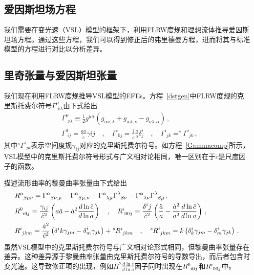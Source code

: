 \documentclass[jkps,preprint,fleqn]{revtex4}
\newcommand{\tc}{\tilde{c}}
\begin{document}
\begin{CJK*}{UTF8}{gbsn}
\section{爱因斯坦场方程} \label{sec:EFEs}

我们需要在变光速（VSL）模型的框架下，利用FLRW度规和理想流体推导爱因斯坦场方程。通过这些方程，我们可以得到修正后的弗里德曼方程，进而将其与标准模型的方程进行对比以分析差异。
\subsection{里奇张量与爱因斯坦张量}\label{subsec:RS}
我们现在利用FLRW度规\cite{Lee:2020zts,Lee:2025rpw}推导VSL模型的EFEs。方程~\eqref{dstgen}中FLRW度规的克里斯托费尔符号$\Gamma^{\mu}_{\,\,\nu\lambda}$由下式给出
\begin{align}
&\Gamma^{\mu}_{\,\,\nu\lambda} \equiv \frac{1}{2} g^{\mu\alpha} \left( g_{\alpha\nu,\lambda} + g_{\alpha\lambda,\nu} - g_{\nu\lambda,\alpha} \right) \label{Gamma}\,, \\ &\Gamma^{0}_{\,\,ij} = \frac{a\dot{a}}{\tc} \gamma{ij} \quad , \quad \Gamma^{i}_{\,\,0j} = \frac{1}{\tc}  \frac{\dot{a}}{a} \delta^i_j \quad , \quad \Gamma^{i}_{\,\,jk} = ^{s}\Gamma^{i}_{\,\,jk}  \label{Gammacomp} \,, \end{align}
其中$^{s}\Gamma^{i}_{\,\,jk}$表示空间度规$\gamma_{ij}$对应的克里斯托费尔符号。如方程~\eqref{Gammacomp}所示，VSL模型中的克里斯托费尔符号形式与广义相对论相同，唯一区别在于$\tc$是尺度因子的函数。

描述流形曲率的黎曼曲率张量由下式给出
\begin{align}
&\tensor{R}{^\alpha_\beta_\mu_\nu} = \tensor{\Gamma}{^\alpha_\beta_\nu_,_\mu} - \tensor{\Gamma}{^\alpha_\beta_\mu_,_\nu} + \tensor{\Gamma}{^\alpha_\lambda_\mu} \tensor{\Gamma}{^\lambda_\beta_\nu} - \tensor{\Gamma}{^\alpha_\lambda_\nu} \tensor{\Gamma}{^\lambda_\beta_\mu} \label{Rabmu} \,, \\ &\tensor{R}{^0_i_0_j} = \frac{\gamma_{ij}}{\tc^2} \left( a \ddot{a} - \dot{a}^2 \frac{d \ln \tc}{d \ln a} \right) \quad , \quad \tensor{R}{^i_0_0_j} = \frac{\delta^{i}{j}}{\tc^2} \left( \frac{\ddot{a}}{a} - \frac{\dot{a}^2}{a^2} \frac{d \ln \tc}{ d \ln a}  \right) \,, \label{R0i0j} \\ &\tensor{R}{^i_j_k_m} = \frac{\dot{a}^2}{\tc^2} \left( \delta^{i}{k} \gamma_{jm} - \delta^i_m \gamma_{jk} \right) + \tensor[^s]{R}{^i_j_k_m} \quad , \quad \tensor[^s]{R}{^i_j_k_m} = k \left( \delta^i_k \gamma_{jm} - \delta^i_m \gamma_{jk} \right) \,. \label{Rijkm} \end{align}
虽然VSL模型中的克里斯托费尔符号与广义相对论形式相同，但黎曼曲率张量存在差异。这种差异源于黎曼曲率张量由克里斯托费尔符号的导数导出，而后者包含时变光速。这导致修正项的出现，例如$H^2 \frac{d \ln \tc}{d \ln a}$因子同时出现在$\tensor{R}{^0_i_0_j}$和$\tensor{R}{^i_0_0_j}$中。


\end{CJK*}
\end{document}
